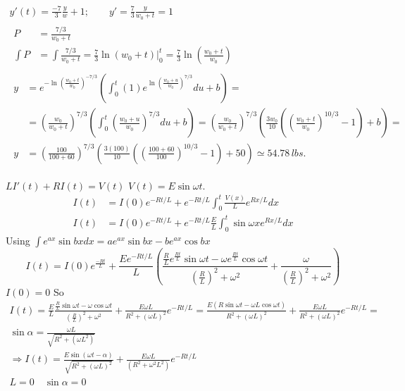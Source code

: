\documentclass[twoside]{amsart}
\theoremstyle{plain}
\theoremstyle{definition}
\newcommand{\exercisehead}[1]
  {\smallskip
   \noindent{\small\bf Exercise #1.}}
\begin{document}
\[
\begin{gathered}
  y'(t) = \frac{-7}{3} \frac{y}{w} + 1; \quad \quad y' = \frac{7}{3}\frac{y}{ w_0 +t } = 1 \\
  \begin{aligned}  
    P & = \frac{7/3}{ w_0 +t } \\
    \int P & = \int \frac{ 7/3}{ w_0 + t } = \frac{7}{3} \left. \ln{ (w_0 + t ) }  \right|_0^t = \frac{7}{3} \ln{ \left( \frac{ w_0 +t }{ w_0 } \right) } 
  \end{aligned} \\
  \begin{aligned}
 y & = e^{ - \ln{ \left( \frac{ w_0 + t}{ w_0 } \right)^{-7/3} } } \left( \int_0^t (1) e^{ \ln{ \left( \frac{ w_0 + u }{ w_0} \right)^{7/3} } } du + b \right) = \\
 & = \left( \frac{w_0}{ w_0 +t } \right)^{7/3} \left( \int_0^t \left( \frac{ w_0 + u }{ w_0} \right)^{7/3} du + b \right) = \left( \frac{w_0}{ w_0 +t } \right)^{7/3} \left( \frac{ 3 w_0}{ 10 } \left( \left( \frac{w_0 +t }{w_0} \right)^{10/3} - 1 \right) + b \right) = \\
 y & = \left( \frac{ 100}{ 100 + 60 } \right)^{7/3} \left( \frac{ 3 (100)}{ 10 } \left( \left( \frac{ 100 + 60}{ 100 } \right)^{10/3} - 1 \right) + 50 \right) \simeq 54.78 \, lbs.
  \end{aligned}
\end{gathered}
\]

\exercisehead{11} $LI'(t) +RI(t) = V(t)$ \quad \quad $V(t) = E\sin{\omega t}$.  
\[
\begin{aligned}
  I(t) & = I(0) e^{-Rt/L} + e^{-Rt/L} \int_0^t \frac{V(x)}{L} e^{Rx/L} dx \\
  I(t) & = I(0) e^{-Rt/L} + e^{-Rt/L} \frac{E}{L} \int_0^t \sin{ \omega x} e^{Rx/L} dx 
\end{aligned}
\]
Using $\int e^{ax} \sin{bx} dx = a e^{ax} \sin{bx} - be^{ax} \cos{bx} $
\[
I(t) = I(0) e^{\frac{-Rt}{L} } + \frac{E e^{ -Rt/L}}{ L } \left( \frac{ \frac{R}{L} e^{\frac{Rt}{L}} \sin{ \omega t} - \omega e^{\frac{Rt}{L} } \cos{ \omega t}}{ \left( \frac{R}{L} \right)^2 + \omega^2 } + \frac{ \omega }{ \left( \frac{R}{L} \right)^2 + \omega^2 } \right)
\]
$I(0) =0 $ \quad So 
\[
\begin{gathered}
  I(t)  = \frac{E}{L} \frac{ \frac{R}{L} \sin{ \omega t} - \omega \cos{ \omega t}}{ \left( \frac{R}{L} \right)^2 + \omega^2 } + \frac{ E \omega L}{ R^2 + (\omega L)^2 } e^{-Rt/L} = \frac{ E (R \sin{ \omega t } - \omega L \cos{ \omega t} ) }{ R^2 + (\omega L )^2 } + \frac{ E \omega L }{ R^2 + (\omega L)^2 } e^{ -Rt/L} = \\
  \sin{ \alpha } = \frac{ \omega L}{ \sqrt{ R^2 + (\omega L^2) } } \\
  \Longrightarrow I(t) = \frac{ E \sin{ (\omega t- \alpha )} }{ \sqrt{ R^2 + (\omega L )^2 } } + \frac{ E \omega L}{ (R^2 + \omega^2 L^2 )} e^{-Rt/L}  \\
  L = 0 \quad \sin{\alpha} = 0 
\end{gathered} 
\]
\end{document}
